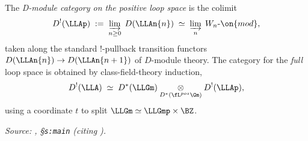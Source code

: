 \begin{definition}
  \label{def:dmod-loop-space}
  The \emph{D-module category on the positive loop space} is the colimit
  \[
    D^!(\LLAp) \;:=\; \varinjlim_{n \geq 0}\; D(\LLAn{n})
    \;\simeq\; \varinjlim_n\; W_n\mbox{-}\on{mod},
  \]
  taken along the standard $!$-pullback transition functors
  $D(\LLAn{n}) \to D(\LLAn{n+1})$ of $D$-module theory. The category for the
  \emph{full} loop space is obtained by class-field-theory induction,
  \[
    D^!(\LLA) \;\simeq\; D^*(\LLGm)
    \underset{D^*(\fL^{pos}\Gm)}{\otimes} D^!(\LLAp),
  \]
  using a coordinate $t$ to split $\LLGm \simeq \LLGmp \times \BZ$.

  \textit{Source: \cite{hilburn-raskin}, \S\texttt{s:main} (citing \cite{dmod}).}
\end{definition}

